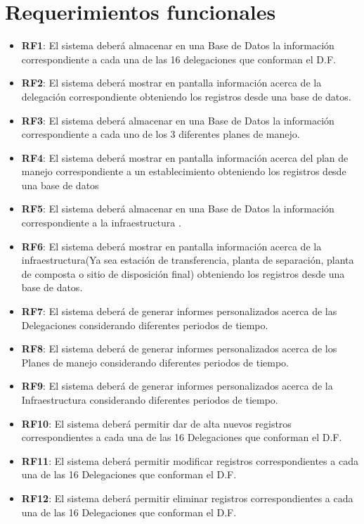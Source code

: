 \section{Requerimientos funcionales}
	\begin{itemize}
		\item \textbf{RF1}: El sistema deberá almacenar en una Base de Datos la información correspondiente a cada una de las 16 delegaciones que conforman el D.F. 
		\item \textbf{RF2}: El sistema deberá mostrar en pantalla información acerca de la delegación correspondiente obteniendo los registros desde una base de datos.
		\item \textbf{RF3}: El sistema deberá almacenar en una Base de Datos la información   correspondiente a cada uno de los 3 diferentes planes de manejo. 
		\item \textbf{RF4}: El sistema deberá mostrar en pantalla información acerca del plan de manejo correspondiente a un establecimiento obteniendo los registros desde una base de datos
		\item \textbf{RF5}: El sistema deberá almacenar en una Base de Datos la información correspondiente a la infraestructura . 
		\item \textbf{RF6}: El sistema deberá mostrar en pantalla información acerca de la infraestructura(Ya sea estación de transferencia, planta de separación, planta de composta o sitio de disposición final) obteniendo los registros desde una base de datos.
		\item \textbf{RF7}: El sistema deberá de generar informes personalizados acerca de las Delegaciones considerando diferentes periodos de tiempo.
		\item \textbf{RF8}: El sistema deberá de generar informes personalizados  acerca de los Planes de manejo considerando diferentes periodos de tiempo.
		\item \textbf{RF9}: El sistema deberá de generar informes personalizados acerca de la Infraestructura considerando diferentes periodos de tiempo.
		\item \textbf{RF10}: El sistema deberá permitir dar de alta nuevos registros correspondientes a cada una de las 16 Delegaciones que conforman el D.F.
		\item \textbf{RF11}: El sistema deberá permitir modificar registros correspondientes a cada una de las 16 Delegaciones que conforman el D.F.
		\item \textbf{RF12}: El sistema deberá permitir eliminar registros correspondientes a cada una de las 16 Delegaciones que conforman el D.F.

\end{itemize}
